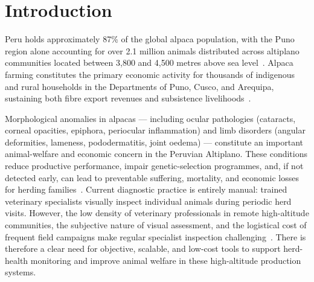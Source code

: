 \documentclass[journal=animals,article=article,submit=mdpi,moreauthors=true,pdftex]{mdpi}
\begin{document}
\section{Introduction}
\label{sec:intro}

Peru holds approximately 87\% of the global alpaca population, with the Puno region
alone accounting for over 2.1 million animals distributed across altiplano communities
located between 3,800 and 4,500 metres above sea level~\cite{inei2024}.
Alpaca farming constitutes the primary economic activity for thousands of indigenous and
rural households in the Departments of Puno, Cusco, and Arequipa, sustaining both
fibre export revenues and subsistence livelihoods~\cite{senasa2023}.

Morphological anomalies in alpacas --- including ocular pathologies (cataracts, corneal
opacities, epiphora, periocular inflammation) and limb disorders (angular deformities,
lameness, pododermatitis, joint oedema) --- constitute an important animal-welfare and
economic concern in the Peruvian Altiplano. These conditions reduce productive
performance, impair genetic-selection programmes, and, if not detected early, can lead to
preventable suffering, mortality, and economic losses for herding
families~\cite{morante2009,fowler2010}.
Current diagnostic practice is entirely manual: trained veterinary specialists visually
inspect individual animals during periodic herd visits. However, the low density of
veterinary professionals in remote high-altitude communities, the subjective nature of
visual assessment, and the logistical cost of frequent field campaigns make regular
specialist inspection challenging~\cite{ali2023}. There is therefore a clear need for
objective, scalable, and low-cost tools to support herd-health monitoring and improve
animal welfare in these high-altitude production systems.
\end{document}
